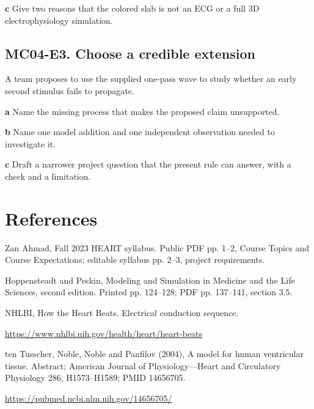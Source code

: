\documentclass[11pt,letterpaper]{article}
\theoremstyle{definition}\newtheorem{definition}{Definition}\newtheorem{example}{Example}
\numberwithin{equation}{section}
\begin{document}
\textbf{c} Give two reasons that the colored slab is not an ECG or a full 3D electrophysiology simulation.

\par\noindent\begin{minipage}{\linewidth}
\subsection*{MC04-E3. Choose a credible extension}
A team proposes to use the supplied one-pass wave to study whether an early second stimulus fails to propagate.

\textbf{a} Name the missing process that makes the proposed claim unsupported.

\end{minipage}\par\medskip
\textbf{b} Name one model addition and one independent observation needed to investigate it.

\textbf{c} Draft a narrower project question that the present rule can answer, with a check and a limitation.

\section*{References}
\noindent\begin{minipage}{\linewidth}
Zan Ahmad, Fall 2023 HEART syllabus. Public PDF pp. 1--2, Course Topics and Course Expectations; editable syllabus pp. 2--3, project requirements.

\end{minipage}\par\medskip
\noindent\begin{minipage}{\linewidth}
Hoppensteadt and Peskin, Modeling and Simulation in Medicine and the Life Sciences, second edition. Printed pp. 124--128; PDF pp. 137--141, section 3.5.

\end{minipage}\par\medskip
\noindent\begin{minipage}{\linewidth}
NHLBI, How the Heart Beats. Electrical conduction sequence.

\url{https://www.nhlbi.nih.gov/health/heart/heart-beats}
\end{minipage}\par\medskip
\noindent\begin{minipage}{\linewidth}
ten Tusscher, Noble, Noble and Panfilov (2004), A model for human ventricular tissue. Abstract; American Journal of Physiology---Heart and Circulatory Physiology 286, H1573--H1589; PMID 14656705.

\url{https://pubmed.ncbi.nlm.nih.gov/14656705/}
\end{minipage}\par\medskip
\end{document}
